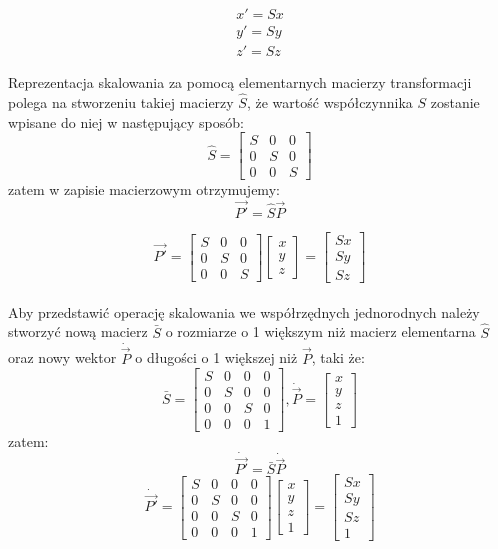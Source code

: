 \documentclass[licencjacka]{pracamgr}
\begin{document}
$$
\begin{array}{lr}
x'=Sx \\
y'=Sy \\
z'=Sz
\end{array}
$$

Reprezentacja skalowania za pomocą elementarnych macierzy transformacji polega na stworzeniu takiej macierzy $\hat{S}$, że wartość współczynnika $S$ zostanie wpisane do niej w następujący sposób:
$$
\hat{S}
=
\begin{bmatrix}
S & 0 & 0 \\
0 & S & 0 \\
0 & 0 & S
\end{bmatrix}
$$
zatem w zapisie macierzowym otrzymujemy:
$$
\vec{P'}=\hat{S} \vec{P}
$$

$$
\vec{P'}
=
\begin{bmatrix}
S & 0 & 0 \\
0 & S & 0 \\
0 & 0 & S
\end{bmatrix}
\begin{bmatrix} 
x \\ 
y \\ 
z 
\end{bmatrix} 
=
\begin{bmatrix} 
Sx \\ 
Sy \\ 
Sz 
\end{bmatrix}
$$
\\
Aby przedstawić operację skalowania we współrzędnych jednorodnych należy stworzyć nową macierz $\bar{S}$ o rozmiarze o 1 większym niż macierz elementarna $\hat{S}$ oraz nowy wektor $\dot{\vec{P}}$ o długości o 1 większej niż $\vec{P}$, taki że:
$$
\bar{S} 
= 
\begin{bmatrix}
S & 0 & 0 & 0 \\
0 & S & 0 & 0 \\
0 & 0 & S & 0 \\
0 & 0 & 0 & 1
\end{bmatrix}
,  
\dot{\vec{P}}
=
\begin{bmatrix} 
x \\ 
y \\ 
z \\
1
\end{bmatrix} 
$$
zatem:
$$
\dot{\vec{P'}}=\bar{S} \dot{\vec{P}}
$$
$$
\dot{\vec{P'}} = 
\begin{bmatrix}
S & 0 & 0 & 0 \\
0 & S & 0 & 0 \\
0 & 0 & S & 0 \\
0 & 0 & 0 & 1
\end{bmatrix}
\begin{bmatrix} 
x \\ 
y \\ 
z \\
1
\end{bmatrix} 
=
\begin{bmatrix} 
Sx \\ 
Sy \\ 
Sz \\
1
\end{bmatrix}
$$
\end{document}
